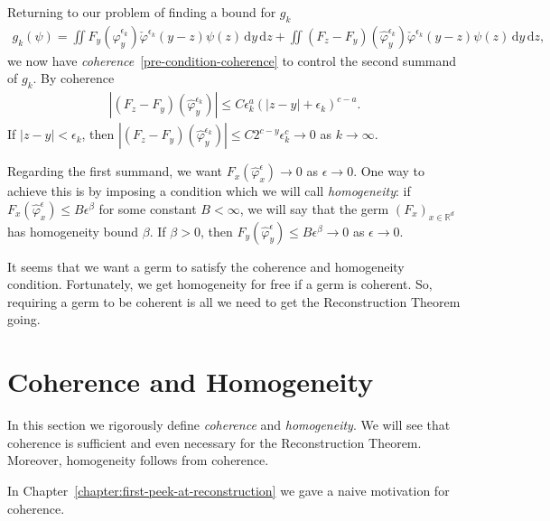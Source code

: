Returning to our problem of finding a bound for \(g_k\)
\begin{align*}
    g_k(\psi) = \iint F_y(\hat \varphi^{\epsilon_k}_y) \check \varphi^{\epsilon_k}(y-z) \psi(z) \, \mathrm{d}y\, \mathrm{d}z 
    + \iint (F_z - F_y)(\hat \varphi^{\epsilon_k}_y) \check \varphi^{\epsilon_k}(y-z) \psi(z) \, \mathrm{d}y\, \mathrm{d}z,
\end{align*}
we now have \emph{coherence}~\eqref{pre-condition-coherence} to control the second summand of \(g_k\). By coherence 
\begin{align*}
    |(F_z - F_y)(\hat \varphi^{\epsilon_k}_y)| \leq C \epsilon_k^{a} {(|z-y| + \epsilon_k)}^{c-a}.
\end{align*}
If \(|z-y| < \epsilon_k\), then \(|(F_z - F_y)(\hat \varphi^{\epsilon_k}_y)| \leq C2^{c-y} \epsilon_k^c \to 0\) as \(k \to \infty\).

Regarding the first summand, we want \(F_x(\hat \varphi^{\epsilon}_x) \to 0\) as \(\epsilon \to 0\). One way to achieve this is by imposing a condition which we will call \emph{homogeneity}: if \(F_x(\hat \varphi^{\epsilon}_x) \leq B \epsilon^{\beta}\) for some constant \(B < \infty\), we will say that the germ \({(F_x)}_{x \in \mathbb{R}^d}\) has homogeneity bound \(\beta\). If \(\beta > 0\), then   \(F_y(\hat \varphi^{\epsilon}_y) \leq B \epsilon^\beta \to 0\) as \(\epsilon \to 0\).  

It seems that we want a germ to satisfy the coherence and homogeneity condition. Fortunately, we get homogeneity for free if a germ is coherent. So, requiring a germ to be coherent is all we need to get the Reconstruction Theorem going.

\section{Coherence and Homogeneity}\label{chapter:coherence}

In this section we rigorously define \emph{coherence} and \emph{homogeneity}. We will see that coherence is sufficient and even necessary for the Reconstruction Theorem. Moreover, homogeneity follows from coherence.

In Chapter~\ref{chapter:first-peek-at-reconstruction} we gave a naive motivation for coherence.

